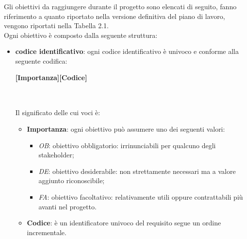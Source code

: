 Gli obiettivi da raggiungere durante il progetto sono elencati di seguito, fanno riferimento a quanto riportato nella versione definitiva del piano di lavoro, 
vengono riportati nella Tabella 2.1.
\\Ogni obiettivo è composto dalla seguente struttura:
\begin{itemize}
	\item \textbf{codice identificativo}: ogni codice identificativo è univoco e conforme alla seguente codifica:\\
	\centerline{\textbf{[Importanza][Codice]}} \\ \\
	Il significato delle cui voci è:
	\begin{itemize}
		\item \textbf{Importanza}: ogni obiettivo può assumere uno dei seguenti valori:
		\begin{itemize}
			\item \textit{OB}: obiettivo obbligatorio: irrinunciabili per qualcuno degli stakeholder;
			\item \textit{DE}: obiettivo desiderabile: non strettamente necessari ma  a valore aggiunto riconoscibile;
			\item \textit{FA}: obiettivo facoltativo: relativamente utili oppure contrattabili più avanti nel progetto.	
		\end{itemize}
		\item \textbf{Codice}: è un identificatore univoco del requisito segue un ordine incrementale.
	\end{itemize}
\end{itemize}

